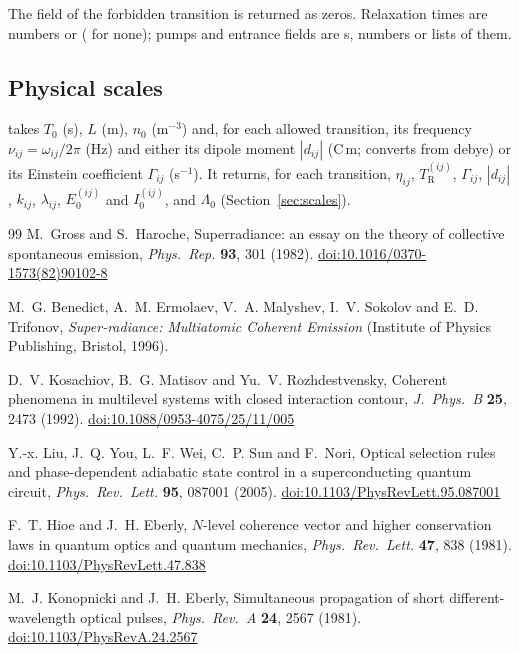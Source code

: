 \documentclass[12pt,a4paper]{article}
\newcommand{\T}{T_0}
\newcommand{\TR}[1]{T_{\mathrm{R}}^{(#1)}}
\begin{document}
The field of the forbidden transition is returned as zeros. Relaxation times
are numbers or  ( for none); pumps and entrance
fields are s, numbers or lists of them.

\subsection{Physical scales}

 takes $\T$ (s), $L$ (m), $n_0$
(m$^{-3}$) and, for each allowed transition, its frequency
$\nu_{ij} = \omega_{ij}/2\pi$ (Hz) and either its dipole moment $|d_{ij}|$
(C\,m;  converts from debye) or its
Einstein coefficient $\Gamma_{ij}$ (s$^{-1}$). It returns, for each
transition, $\eta_{ij}$, $\TR{ij}$, $\Gamma_{ij}$, $|d_{ij}|$, $k_{ij}$,
$\lambda_{ij}$, $E_0^{(ij)}$ and $I_0^{(ij)}$, and $\Lambda_0$
(Section~\ref{sec:scales}).

\begin{thebibliography}{99}
M.~Gross and S.~Haroche, Superradiance: an essay on the theory of collective
spontaneous emission, \emph{Phys.\ Rep.} \textbf{93}, 301 (1982).
\href{https://doi.org/10.1016/0370-1573(82)90102-8}{doi:10.1016/0370-1573(82)90102-8}

M.~G. Benedict, A.~M. Ermolaev, V.~A. Malyshev, I.~V. Sokolov and
E.~D. Trifonov, \emph{Super-radiance: Multiatomic Coherent Emission}
(Institute of Physics Publishing, Bristol, 1996).

D.~V. Kosachiov, B.~G. Matisov and Yu.~V. Rozhdestvensky, Coherent phenomena
in multilevel systems with closed interaction contour, \emph{J.\ Phys.\ B}
\textbf{25}, 2473 (1992).
\href{https://doi.org/10.1088/0953-4075/25/11/005}{doi:10.1088/0953-4075/25/11/005}

Y.-x. Liu, J.~Q. You, L.~F. Wei, C.~P. Sun and F.~Nori, Optical selection
rules and phase-dependent adiabatic state control in a superconducting quantum
circuit, \emph{Phys.\ Rev.\ Lett.} \textbf{95}, 087001 (2005).
\href{https://doi.org/10.1103/PhysRevLett.95.087001}{doi:10.1103/PhysRevLett.95.087001}

F.~T. Hioe and J.~H. Eberly, $N$-level coherence vector and higher
conservation laws in quantum optics and quantum mechanics,
\emph{Phys.\ Rev.\ Lett.} \textbf{47}, 838 (1981).
\href{https://doi.org/10.1103/PhysRevLett.47.838}{doi:10.1103/PhysRevLett.47.838}

M.~J. Konopnicki and J.~H. Eberly, Simultaneous propagation of short
different-wavelength optical pulses, \emph{Phys.\ Rev.\ A} \textbf{24}, 2567
(1981).
\href{https://doi.org/10.1103/PhysRevA.24.2567}{doi:10.1103/PhysRevA.24.2567}
\end{thebibliography}

\DocFooter
\end{document}
